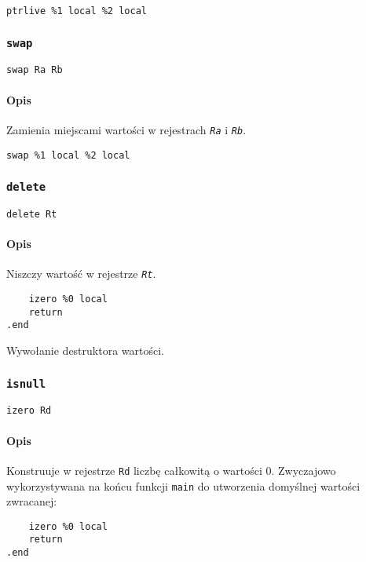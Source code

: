 \begin{lstlisting}
ptrlive %1 local %2 local
\end{lstlisting}

\subsubsection{\texttt{swap}}

\begin{lstlisting}
swap Ra Rb
\end{lstlisting}

\paragraph*{Opis} Zamienia miejscami wartości w rejestrach \texttt{\emph{Ra}} i
\texttt{\emph{Rb}}.

\begin{lstlisting}
swap %1 local %2 local
\end{lstlisting}

\subsubsection{\texttt{delete}}

\begin{lstlisting}
delete Rt
\end{lstlisting}

\paragraph*{Opis} Niszczy wartość w rejestrze \texttt{\emph{Rt}}.

\begin{lstlisting}
	izero %0 local
	return
.end
\end{lstlisting}

Wywołanie destruktora wartości.

\subsubsection{\texttt{isnull}}

\begin{lstlisting}
izero Rd
\end{lstlisting}

\paragraph*{Opis} Konstruuje w rejestrze \texttt{Rd} liczbę całkowitą o wartości 0.
Zwyczajowo wykorzystywana na końcu funkcji \texttt{main} do utworzenia domyślnej wartości zwracanej:

\begin{lstlisting}
	izero %0 local
	return
.end
\end{lstlisting}
